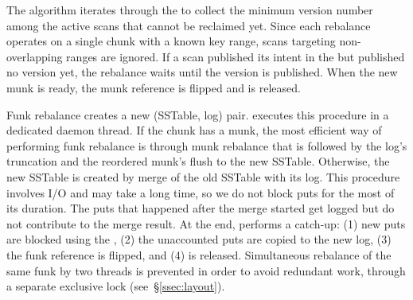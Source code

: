 The algorithm iterates through the  to collect the minimum version number among the active scans that cannot be reclaimed yet. 
Since each rebalance operates on a single chunk with a known key range, scans targeting non-overlapping ranges are ignored.
If a scan published its intent in the   but published no version yet, the rebalance waits until the version is published. 
When the new munk is ready, the munk reference is flipped and  is released.

Funk rebalance creates a new (SSTable, log) pair. \sys\/ executes this procedure in a dedicated daemon thread. If the chunk has a munk, 
the most efficient way of performing funk rebalance is through munk rebalance that is followed by the log's truncation and the
reordered munk's flush to the new SSTable. Otherwise, the new SSTable is created by merge of the old SSTable with its log. 
This procedure involves I/O and may take a long time, so we do not block puts for the most of its duration. The puts that happened 
after the merge started get logged but do not contribute to the merge result. At the end, \sys\/ performs a catch-up: 
(1) new puts are blocked using the ,
(2) the unaccounted puts are copied to the new log, 
(3) the funk reference is flipped, and (4)  is released. 
Simultaneous rebalance of the same funk by two threads is prevented in order to avoid redundant work,
through a separate exclusive lock (see~\S\ref{ssec:layout}). %


